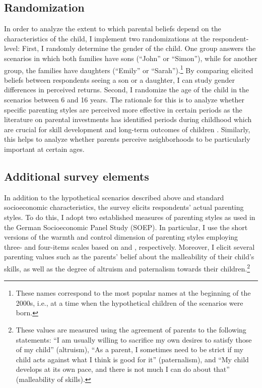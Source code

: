\documentclass[12pt, a4paper, english]{article}
\begin{document}
\subsection{Randomization}
In order to analyze the extent to which parental beliefs depend on the characteristics of the child, I implement two randomizations at the respondent-level: First, I randomly determine the gender of the child. One group answers the scenarios in which both families have sons (``John'' or ``Simon''), while for another group, the families have daughters (``Emily'' or ``Sarah'').\footnote{These names correspond to the most popular names at the beginning of the 2000s, i.e., at a time when the hypothetical children of the scenarios were born.} By comparing elicited beliefs between respondents seeing a son or a daughter, I can study gender differences in perceived returns. Second, I randomize the age of the child in the scenarios between 6 and 16 years. The rationale for this is to analyze whether specific parenting styles are perceived more effective in certain periods as the literature on parental investments has identified periods during childhood which are crucial for skill development and long-term outcomes of children \citep{CunhaHeckman2007,Cunhaetal2010}. Similarly, this helps to analyze whether parents perceive neighborhoods to be particularly important at certain ages.

\subsection{Additional survey elements}
In addition to the hypothetical scenarios described above and standard socioeconomic characteristics, the survey elicits respondents' actual parenting styles. To do this, I adopt two established measures of parenting styles as used in the German Socioeconomic Panel Study (SOEP). In particular, I use the short versions of the warmth and control dimension of parenting styles employing three- and four-items scales based on \citet{Perrisetal1980} and \citet{Schwarzetal1997}, respectively. Moreover, I elicit several parenting values such as the parents' belief about the malleability of their child's skills, as well as the degree of altruism and paternalism towards their children.\footnote{These values are measured using the agreement of parents to the following statements: ``I am usually willing to sacrifice my own desires to satisfy those of my child'' (altruism), ``As a parent, I sometimes need to be strict if my child acts against what I think is good for it'' (paternalism), and ``My child develops at its own pace, and there is not much I can do about that'' (malleability of skills).}
\end{document}
